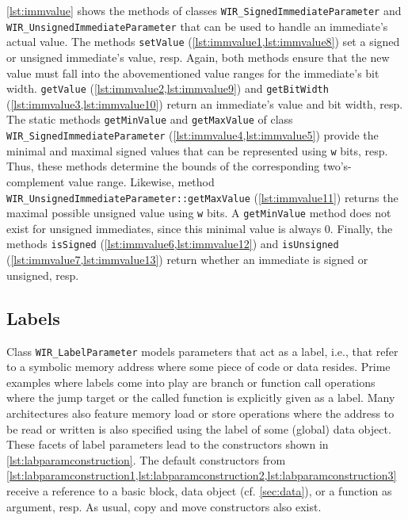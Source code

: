 \cref{lst:immvalue} shows the methods of classes \texttt{WIR\_SignedImmediateParameter} and \texttt{WIR\_UnsignedImmediate\-Parameter} that can be used to handle an immediate's actual value.
The methods \texttt{setValue} (\cref{lst:immvalue1,lst:immvalue8}) set a signed or unsigned immediate's value, resp.
Again, both methods ensure that the new value must fall into the abovementioned value ranges for the immediate's bit width.
\texttt{getValue} (\cref{lst:immvalue2,lst:immvalue9}) and \texttt{getBitWidth} (\cref{lst:immvalue3,lst:immvalue10}) return an immediate's value and bit width, resp.
The static methods \texttt{getMinValue} and \texttt{getMax\-Value} of class \texttt{WIR\_SignedImmediateParameter} (\cref{lst:immvalue4,lst:immvalue5}) provide the minimal and maximal signed values that can be represented using \texttt{w} bits, resp.
Thus, these methods determine the bounds of the corresponding two's-complement value range.
Likewise, method \texttt{WIR\_UnsignedImmediateParameter::getMaxValue} (\cref{lst:immvalue11}) returns the maximal possible unsigned value using \texttt{w} bits.
A \texttt{getMinValue} method does not exist for unsigned immediates, since this minimal value is always 0.
Finally, the methods \texttt{isSigned} (\cref{lst:immvalue6,lst:immvalue12}) and \texttt{isUnsigned} (\cref{lst:immvalue7,lst:immvalue13}) return whether an immediate is signed or unsigned, resp.


\subsection{Labels}
\label{ssec:labparams}

Class \texttt{WIR\_LabelParameter} models parameters that act as a label, i.e., that refer to a symbolic memory address where some piece of code or data resides.
Prime examples where labels come into play are branch or function call operations where the jump target or the called function is explicitly given as a label.
Many architectures also feature memory load or store operations where the address to be read or written is also specified using the label of some (global) data object.
These facets of label parameters lead to the constructors shown in \cref{lst:labparamconstruction}.
The default constructors from \cref{lst:labparamconstruction1,lst:labparamconstruction2,lst:labparamconstruction3} receive a reference to a basic block, data object (cf. \cref{sec:data}), or a function as argument, resp.
As usual, copy and move constructors also exist.


